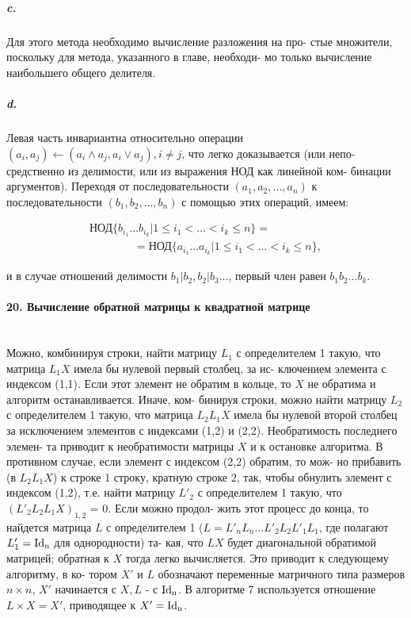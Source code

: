 \documentclass{mai_book}
\begin{document}
{\subparagraph{c.} Для этого метода необходимо вычисление разложения на про-
стые множители, поскольку для метода, указанного в главе, необходи-
мо только вычисление наибольшего общего делителя.

\subparagraph{d.} Левая часть инвариантна относительно операции 
$(a_i,a_j) \longleftarrow (a_i \wedge a_{j},a_i \vee a_j), i \neq j$, что легко доказывается (или непо-
средственно из делимости, или из выражения НОД как линейной ком-
бинации аргументов). Переходя от последовательности $(a_1,a_2,\ldots,a_n)$
к последовательности $(b_1,b_2,\ldots,b_n)$ с помощью этих операций, имеем:

\begin{eqnarray*}
& \text{НОД}\{b_{i_1}\ldots b_{i_k} | 1 \leqslant i_1 < \dots < i_k \leqslant n\} =    & \\
& \qquad\qquad=\text{НОД}\{a_{i_1} \ldots a_{i_k} | 1 \leqslant i_1 < \dots < i_k \leqslant n\}, &
\end{eqnarray*}

\noindent и в случае отношений делимости $b_1 | b_2, b_2 | b_3 \ldots$, первый член равен
$b_{1}b_{2}\ldots b_k$.




\paragraph{20. Вычисление обратной матрицы к квадратной матрице} \mbox{}\\


Можно, комбинируя строки, найти матрицу $L_1$ с определителем 1
такую, что матрица $L_{1}X$ имела бы нулевой первый столбец, за ис-
ключением элемента с индексом (1,1). Если этот элемент не обратим
в кольце, то $X$ не обратима и алгоритм останавливается. Иначе, ком-
бинируя строки, можно найти матрицу $L_2$ с определителем 1 такую,
что матрица $L_{2}L_{1}X$ имела бы нулевой второй столбец за исключением
элементов с индексами (1,2) и (2,2). Необратимость последнего элемен-
та приводит к необратимости матрицы $X$ и к остановке алгоритма.
В противном случае, если элемент с индексом (2,2) обратим, то мож-
но прибавить (в $L_{2}L_{1}X$) к строке 1 строку, кратную строке 2, так,
чтобы обнулить элемент с индексом (1,2), т.е. найти матрицу $L'_{2}$ с
определителем 1 такую, что $(L'_{2}L_{2}L_{1}X)_{1,2}$ = 0. Если можно продол-
жить этот процесс до конца, то найдется матрица $L$ с определителем 1
($L = L'_{n}L_{n}\ldots L'_{2}L_{2}L'_{1}L_{1}$, где полагают $L'_{1} = \rm{I}{d_n}$ для однородности) та-
кая, что $LX$ будет диагональной обратимой матрицей; обратная к $X$
тогда легко вычисляется. Это приводит к следующему алгоритму, в ко-
тором $X'$ и $L$ обозначают переменные матричного типа размеров $n \times n$,
$X'$ начинается с $X, L$ - с $\rm{I}{d_n}$. В алгоритме 7 используется отношение
$L \times X = X'$, приводящее к $X' = \rm{I}{d_n}$.

}
\end{document}
